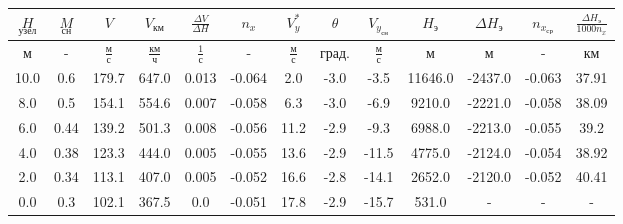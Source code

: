 \begin{tabular}{|c|c|c|c|c|c|c|c|c|c|c|c|c|}
\hline
$\underset{узел}{H}$ & $\underset{сн}{M}$ & $V$ & $V_{км}$ & $\frac{\Delta V}{\Delta H}$ & $n_x$ & $V_{y}^*$ & $\theta$ & $V_{y_{сн}}$ & $H_э$ & $\Delta H_э$ & $n_{x_{ср}}$ & $\frac{\Delta H_{э}}{1000 n_x}$ \\ 
\hline
м & - & $\frac{м}{с}$ & $\frac{км}{ч}$ & $\frac{1}{с}$ & - & $\frac{м}{с}$ & $град.$ & $\frac{м}{с}$ & м & м & - & км \\ 
\hline
10.0 & 0.6 & 179.7 & 647.0 & 0.013 & -0.064 & 2.0 & -3.0 & -3.5 & 11646.0 & -2437.0 & -0.063 & 37.91 \\ 
\hline
8.0 & 0.5 & 154.1 & 554.6 & 0.007 & -0.058 & 6.3 & -3.0 & -6.9 & 9210.0 & -2221.0 & -0.058 & 38.09 \\ 
\hline
6.0 & 0.44 & 139.2 & 501.3 & 0.008 & -0.056 & 11.2 & -2.9 & -9.3 & 6988.0 & -2213.0 & -0.055 & 39.2 \\ 
\hline
4.0 & 0.38 & 123.3 & 444.0 & 0.005 & -0.055 & 13.6 & -2.9 & -11.5 & 4775.0 & -2124.0 & -0.054 & 38.92 \\ 
\hline
2.0 & 0.34 & 113.1 & 407.0 & 0.005 & -0.052 & 16.6 & -2.8 & -14.1 & 2652.0 & -2120.0 & -0.052 & 40.41 \\ 
\hline
0.0 & 0.3 & 102.1 & 367.5 & 0.0 & -0.051 & 17.8 & -2.9 & -15.7 & 531.0 & - & - & - \\ 
\hline
\end{tabular}